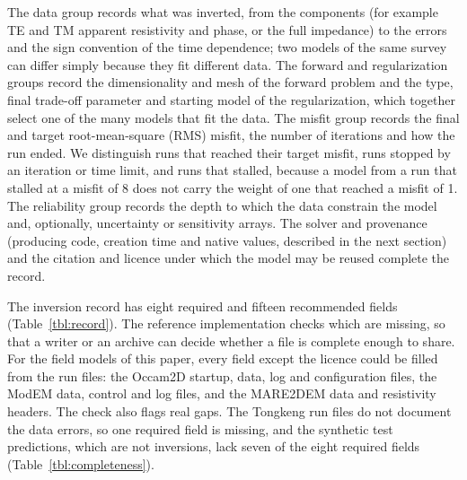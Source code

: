 \documentclass[manuscript]{geophysics}
\begin{document}
The data group records what was inverted, from the components (for
example TE and TM apparent resistivity and phase, or the full
impedance) to the errors and the sign convention of the time
dependence; two models of the same survey can differ simply because
they fit different data. The forward and regularization groups record
the dimensionality and mesh of the forward problem and the type, final
trade-off parameter and starting model of the regularization, which
together select one of the many models that fit the data. The misfit
group records the final and target root-mean-square (RMS) misfit, the
number of iterations and how the run ended. We distinguish runs that
reached their target misfit, runs stopped by an iteration or time
limit, and runs that stalled, because a model from a run that stalled
at a misfit of 8 does not carry the weight of one that reached a
misfit of 1. The reliability group records the depth to which the data
constrain the model and, optionally, uncertainty or sensitivity arrays.
The solver and provenance (producing code, creation time and native
values, described in the next section) and the citation and licence
under which the model may be reused complete the record.

The inversion record has eight required and fifteen recommended
fields (Table~\ref{tbl:record}). The reference implementation checks
which are missing, so that a writer or an archive can decide whether a
file is complete enough to share. For the field models of this paper,
every field except the licence could be filled from the run files: the
Occam2D startup, data, log and configuration files, the ModEM data,
control and log files, and the MARE2DEM data and resistivity headers.
The check also flags real gaps. The Tongkeng run files do not document
the data errors, so one required field is missing, and the synthetic
test predictions, which are not inversions, lack seven of the eight
required fields (Table~\ref{tbl:completeness}).
\end{document}

